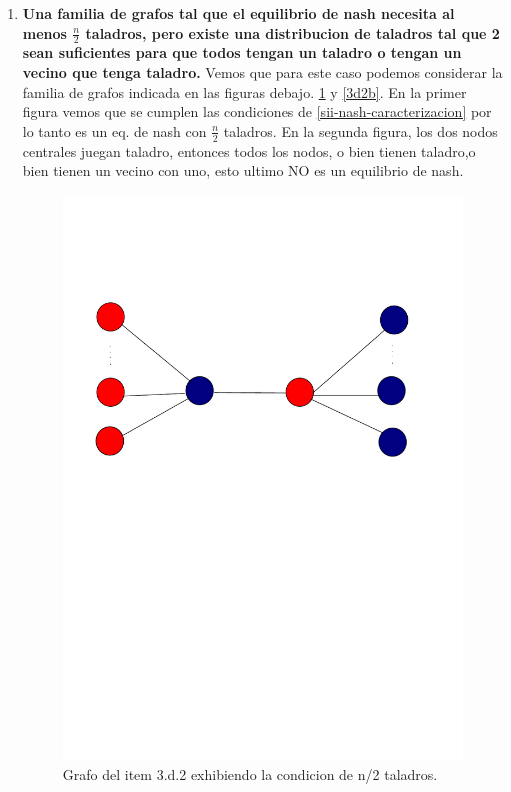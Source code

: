 \begin{enumerate}
	\item \textbf{Una familia de grafos tal que el equilibrio de nash necesita al menos $\frac{n}{2}$ taladros, pero existe una distribucion de taladros tal que 2 sean suficientes para que todos tengan un taladro o tengan un vecino que tenga taladro.} Vemos que para este caso podemos considerar la familia de grafos indicada en las figuras debajo. \ref{3d2} y \ref{3d2b}. En la primer figura vemos que se cumplen las condiciones de \ref{sii-nash-caracterizacion} por lo tanto es un eq. de nash con $\frac{n}{2}$ taladros. En la segunda figura, los dos nodos centrales juegan taladro, entonces todos los nodos, o bien tienen taladro,o bien tienen un vecino con uno, esto ultimo NO es un equilibrio de nash.
	\begin{figure}[H]
		\label{3d2}
	  \centering	
		\includegraphics[scale=0.30]{fig/grafo3d2.pdf}
	  \caption{Grafo del item 3.d.2 exhibiendo la condicion de n/2 taladros.}
	\end{figure}


\end{enumerate}
